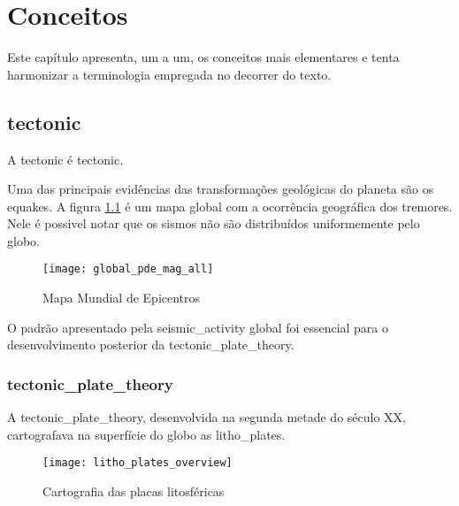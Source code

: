 \chapter{Conceitos}
\label{cap:conceitos}

Este capítulo apresenta, um a um, os conceitos mais elementares 
e tenta harmonizar a terminologia empregada no decorrer do texto.


\section{\Gls{tectonic}}
\label{sec:02_tectonica}

A \gls{tectonic} é \glsdesc*{tectonic}.

Uma das principais evidências das transformações geológicas do planeta 
são os \glspl{equake}. A figura \ref{f:global_epicenters} \citep{lowman_jr_1998}
é um mapa global com a ocorrência geográfica dos tremores. Nele é possivel notar que 
os sismos não são distribuídos uniformemente pelo globo.

\begin{figure}[H]
   \centering
   \texttt{[image: global\_pde\_mag\_all]}
   \caption{Mapa Mundial de Epicentros} 
   \label{f:global_epicenters}
\end{figure}

O padrão apresentado pela \gls{seismic_activity} global foi essencial 
para o desenvolvimento posterior da \gls*{tectonic_plate_theory}.

\subsection{\Gls{tectonic_plate_theory}}
\label{sec:02_placas}

A \gls*{tectonic_plate_theory}, desenvolvida na segunda metade do século XX,
cartografava na superfície do globo as \glspl{litho_plate}.


\begin{figure}[H]
   \centering
   \texttt{[image: litho\_plates\_overview]}
   \caption[Cartografia das placas litosféricas]
   		   {Cartografia das placas litosféricas} 
   \label{f:plates_overview}
\end{figure} 
 
